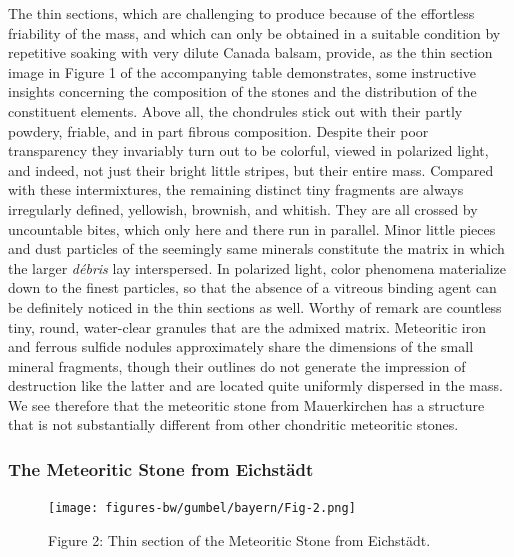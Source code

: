 \documentclass[a4paper, 12pt, oneside]{article}
\begin{document}
The thin sections, which are challenging to produce because of the effortless friability of the mass, and which can only be obtained in a suitable condition by repetitive soaking with very dilute Canada balsam, provide, as the thin section image in Figure 1 of the accompanying table demonstrates, some instructive insights concerning the composition of the stones and the distribution of the constituent elements. Above all, the chondrules stick out with their partly powdery, friable, and in part fibrous composition. Despite their poor transparency they invariably turn out to be colorful, viewed in polarized light, and indeed, not just their bright little stripes, but their entire mass. Compared with these intermixtures, the remaining distinct tiny fragments are always irregularly defined, yellowish, brownish, and whitish. They are all crossed by uncountable bites, which only here and there run in parallel. Minor little pieces and dust particles of the seemingly same minerals constitute the matrix in which the larger \emph{débris} lay interspersed. In polarized light, color phenomena materialize down to the finest particles, so that the absence of a vitreous binding agent can be definitely noticed in the thin sections as well. Worthy of remark are countless tiny, round, water-clear granules that are the admixed matrix. Meteoritic iron and ferrous sulfide nodules approximately share the dimensions of the small mineral fragments, though their outlines do not generate the impression of destruction like the latter and are located quite uniformly dispersed in the mass. We see therefore that the meteoritic stone from Mauerkirchen has a structure that is not substantially different from other chondritic meteoritic stones.
\clearpage
\subsubsection{The Meteoritic Stone from Eichstädt}
\begin{figure}[h]
\centering
\texttt{[image: figures-bw/gumbel/bayern/Fig-2.png]}
\caption{Figure 2: Thin section of the Meteoritic Stone from Eichstädt.}
\end{figure}
\end{document}
